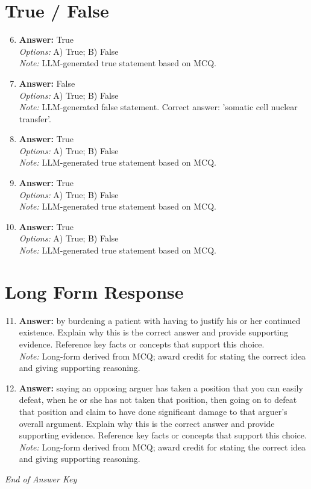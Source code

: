 \documentclass[12pt]{article}
\begin{document}
\section*{True / False}
\begin{enumerate}[label=\arabic*.]
\setcounter{enumi}{5}
\item \textbf{Answer:} True
\\ \textit{Options:} A) True; B) False
\\ \textit{Note:} LLM-generated true statement based on MCQ.
\item \textbf{Answer:} False
\\ \textit{Options:} A) True; B) False
\\ \textit{Note:} LLM-generated false statement. Correct answer: 'somatic cell nuclear transfer'.
\item \textbf{Answer:} True
\\ \textit{Options:} A) True; B) False
\\ \textit{Note:} LLM-generated true statement based on MCQ.
\item \textbf{Answer:} True
\\ \textit{Options:} A) True; B) False
\\ \textit{Note:} LLM-generated true statement based on MCQ.
\item \textbf{Answer:} True
\\ \textit{Options:} A) True; B) False
\\ \textit{Note:} LLM-generated true statement based on MCQ.
\end{enumerate}

\section*{Long Form Response}
\begin{enumerate}[label=\arabic*.]
\setcounter{enumi}{10}
\item \textbf{Answer:} by burdening a patient with having to justify his or her continued existence. Explain why this is the correct answer and provide supporting evidence. Reference key facts or concepts that support this choice.
\\ \textit{Note:} Long-form derived from MCQ; award credit for stating the correct idea and giving supporting reasoning.
\item \textbf{Answer:} saying an opposing arguer has taken a position that you can easily defeat, when he or she has not taken that position, then going on to defeat that position and claim to have done significant damage to that arguer's overall argument. Explain why this is the correct answer and provide supporting evidence. Reference key facts or concepts that support this choice.
\\ \textit{Note:} Long-form derived from MCQ; award credit for stating the correct idea and giving supporting reasoning.
\end{enumerate}

\vfill
\noindent\textit{End of Answer Key}
\end{document}
